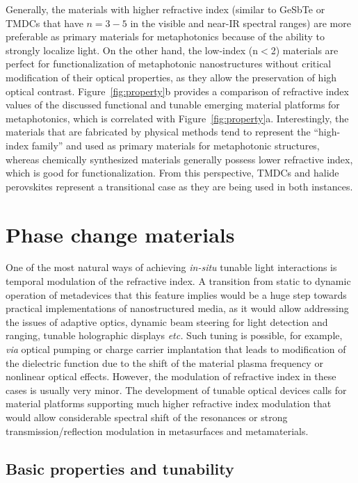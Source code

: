 \documentclass[journal=chreay,manuscript=review]{achemso}
\begin{document}
Generally, the materials with higher refractive index (similar to GeSbTe or TMDCs that have $n=3-5$ in the visible and near-IR spectral ranges) are more preferable as primary materials for metaphotonics because of the ability to strongly localize light. On the other hand, the low-index (n$<$2) materials are perfect for functionalization of metaphotonic nanostructures without critical modification of their optical properties, as they allow the preservation of high optical contrast. 
Figure~\ref{fig:property}b provides a comparison of refractive index values of the discussed functional and tunable emerging material platforms for metaphotonics, which is correlated with Figure~\ref{fig:property}a. Interestingly, the materials that are fabricated by physical methods tend to represent the ``high-index family'' and used as primary materials for metaphotonic structures, whereas chemically synthesized materials generally  possess lower refractive index, which is good for functionalization. From this perspective, TMDCs and halide perovskites represent a transitional case as they are being used in both instances.


\section{Phase change materials}

One of the most natural ways of achieving \textit{in-situ} tunable light interactions is temporal modulation of the refractive index. A transition from static to dynamic operation of metadevices that this feature implies would be a huge step towards practical implementations of nanostructured media, as it would allow addressing the issues of adaptive optics, dynamic beam steering for light detection and ranging, tunable holographic displays \textit{etc.} Such tuning is possible, for example, \textit{via} optical pumping or charge carrier implantation \cite{makarov2015tuning, huang2016gate} that leads to modification of the dielectric function due to the shift of the material plasma frequency or nonlinear optical effects. However, the modulation of refractive index in these cases is usually very minor. The development of tunable optical devices calls for material platforms supporting much higher refractive index modulation that would allow considerable spectral shift of the resonances or strong transmission/reflection modulation in metasurfaces and metamaterials. 

\subsection{Basic properties and tunability}
\end{document}
